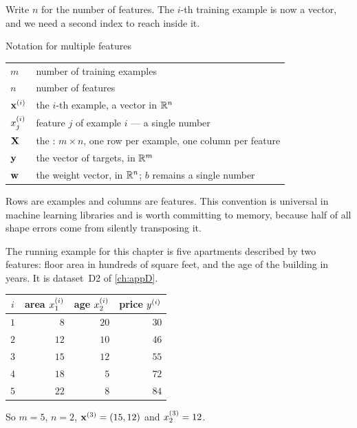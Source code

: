 Write $n$ for the number of features. The $i$-th training example is now a
vector, and we need a second index to reach inside it.

\begin{defbox}{Notation for multiple features}
\begin{center}
\small
\renewcommand{\arraystretch}{1.3}
\begin{tabular}{@{}lL{8.2cm}@{}}
\toprule
$m$ & number of training examples\\
$n$ & number of features\\
$\mathbf{x}^{(i)}$ & the $i$-th example, a vector in $\mathbb{R}^{n}$\\
$x^{(i)}_{j}$ & feature $j$ of example $i$ --- a single number\\
$\mathbf{X}$ & the : $m\times n$, one row per example, one
          column per feature\\
$\mathbf{y}$ & the vector of targets, in $\mathbb{R}^{m}$\\
$\mathbf{w}$ & the weight vector, in $\mathbb{R}^{n}$; $b$ remains a single number\\
\bottomrule
\end{tabular}
\end{center}
Rows are examples and columns are features. This convention is universal in
machine learning libraries and is worth committing to memory, because half of
all shape errors come from silently transposing it.
\end{defbox}

The running example for this chapter is five apartments described by two
features: floor area in hundreds of square feet, and the age of the building in
years. It is dataset~D2 of \cref{ch:appD}.

\begin{center}
\small
\renewcommand{\arraystretch}{1.2}
\begin{tabular}{@{}crrr@{}}
\toprule
$i$ & area $x^{(i)}_{1}$ & age $x^{(i)}_{2}$ & price $y^{(i)}$\\
\midrule
$1$ & $8$  & $20$ & $30$\\
$2$ & $12$ & $10$ & $46$\\
$3$ & $15$ & $12$ & $55$\\
$4$ & $18$ & $5$  & $72$\\
$5$ & $22$ & $8$  & $84$\\
\bottomrule
\end{tabular}
\end{center}

\noindent So $m=5$, $n=2$, $\mathbf{x}^{(3)} = (15, 12)$ and $x^{(3)}_{2} = 12$.

